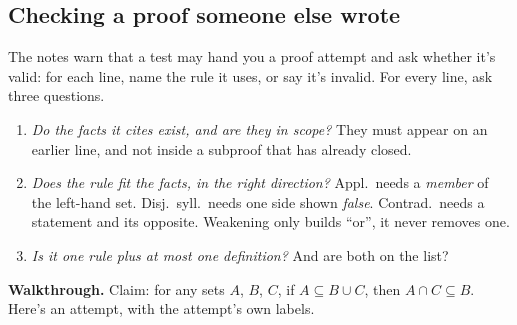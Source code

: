 \subsection{Checking a proof someone else wrote}

The notes warn that a test may hand you a proof attempt and ask whether it's valid: for each line, name the rule it uses, or say it's invalid. For every line, ask three questions.

\begin{enumerate}
  \item \emph{Do the facts it cites exist, and are they in scope?} They must appear on an earlier line, and not inside a subproof that has already closed.
  \item \emph{Does the rule fit the facts, in the right direction?} Appl.\ needs a \emph{member} of the left-hand set. Disj.\ syll.\ needs one side shown \emph{false}. Contrad.\ needs a statement and its opposite. Weakening only builds ``or'', it never removes one.
  \item \emph{Is it one rule plus at most one definition?} And are both on the list?
\end{enumerate}

\textbf{Walkthrough.} Claim: for any sets $A$, $B$, $C$, if $A\subseteq B\cup C$, then $A\cap C\subseteq B$. Here's an attempt, with the attempt's own labels.

\begin{center}
\end{center}

